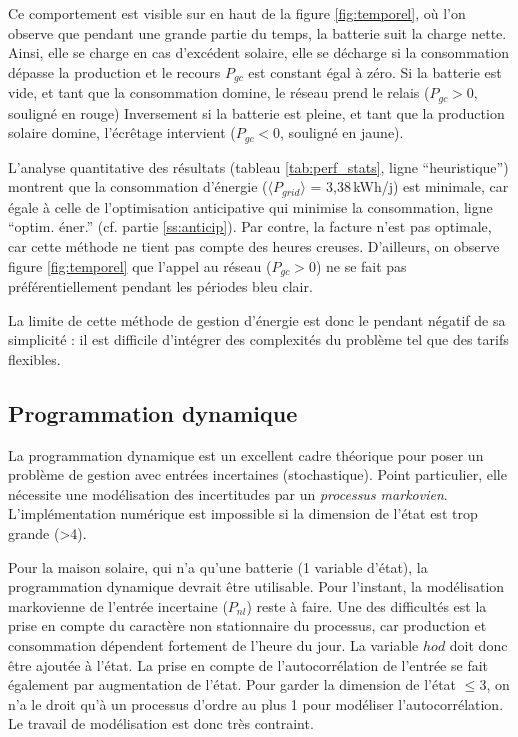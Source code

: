 \documentclass[a4paper,10pt,twocolumn]{article}
\providecommand{\avg}[1]{\langle#1\rangle}
\begin{document}
Ce comportement est visible sur en haut de la figure \ref{fig:temporel},
où l'on observe que pendant une grande partie du temps,
la batterie suit la charge nette. Ainsi, elle se charge en cas d'excédent solaire,
elle se décharge si la consommation dépasse la production
et le recours $P_{gc}$ est constant égal à zéro.
Si la batterie est vide, et tant que la consommation domine,
le réseau prend le relais ($P_{gc}>0$, souligné en rouge)
Inversement si la batterie est pleine, et tant que la production solaire domine,
l'écrêtage intervient ($P_{gc}<0$, souligné en jaune).

L'analyse quantitative des résultats (tableau \ref{tab:perf_stats}, ligne ``heuristique'')
montrent que la consommation d'énergie ($\avg{P_{grid}}$ = 3,38\,kWh/j) est minimale, car égale à celle de 
l'optimisation anticipative qui minimise la consommation, ligne ``optim. éner.''
(cf. partie \ref{ss:anticip}).
Par contre, la facture n'est pas optimale, car cette méthode ne tient pas compte
des heures creuses. D'ailleurs, on observe figure \ref{fig:temporel}
que l'appel au réseau ($P_{gc}>0$) ne se fait pas préférentiellement pendant
les périodes bleu clair.

La limite de cette méthode de gestion d'énergie est donc le pendant négatif
de sa simplicité : il est difficile d'intégrer des complexités du problème
tel que des tarifs flexibles.

\subsection{Programmation dynamique}
La programmation dynamique\cite{Bertsekas:2005:DPOC_vol1} est un
excellent cadre théorique pour poser un problème de gestion avec entrées incertaines (stochastique).
Point particulier, elle nécessite une modélisation des incertitudes par un \emph{processus markovien}\cite{Haessig:2013:ESPy}.
L'implémentation numérique est impossible
si la dimension de l'état est trop grande (>4).

Pour la maison solaire, qui n'a qu'une batterie (1 variable d'état),
la programmation dynamique devrait être utilisable.
Pour l'instant, la modélisation markovienne de l'entrée incertaine ($P_{nl}$) reste à faire.
Une des difficultés est la prise en compte du caractère non stationnaire
du processus, car production et consommation dépendent fortement de l'heure du jour.
La variable $hod$ doit donc être ajoutée à l'état.
La prise en compte de l'autocorrélation de l'entrée se fait également par augmentation
de l'état\cite[§1.4]{Bertsekas:2005:DPOC_vol1}.
Pour garder la dimension de l'état $\leq 3$, on n'a le droit qu'à un processus d'ordre
au plus 1 pour modéliser l'autocorrélation.
Le travail de modélisation est donc très contraint.
\end{document}
